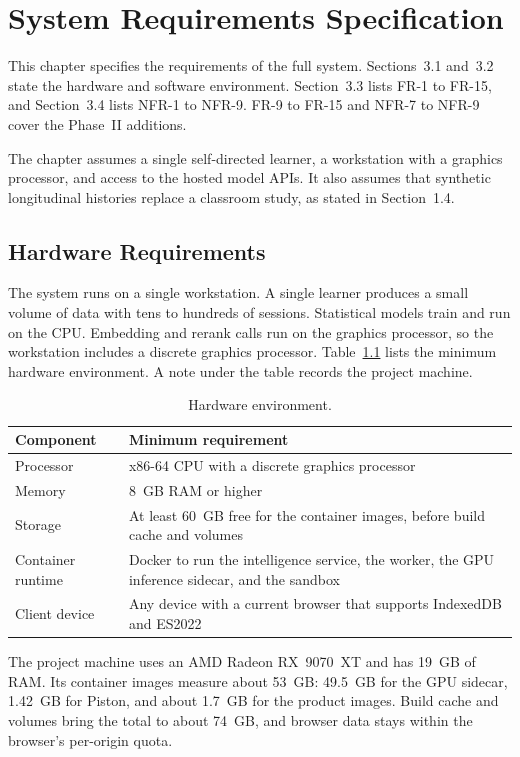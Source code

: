 \chapter{System Requirements Specification}
This chapter specifies the requirements of the full system. Sections~3.1 and~3.2 state the hardware and software environment. Section~3.3 lists FR-1 to FR-15, and Section~3.4 lists NFR-1 to NFR-9. FR-9 to FR-15 and NFR-7 to NFR-9 cover the Phase~II additions.

The chapter assumes a single self-directed learner, a workstation with a graphics processor, and access to the hosted model APIs. It also assumes that synthetic longitudinal histories replace a classroom study, as stated in Section~1.4.

\section{Hardware Requirements}
The system runs on a single workstation. A single learner produces a small volume of data with tens to hundreds of sessions. Statistical models train and run on the CPU. Embedding and rerank calls run on the graphics processor, so the workstation includes a discrete graphics processor. Table~\ref{tab:hardware} lists the minimum hardware environment. A note under the table records the project machine.

\begin{table}[htbp]
\centering
\caption{Hardware environment.}
\label{tab:hardware}
\begin{tabular}{p{4.2cm} p{8.0cm}}
\toprule
\textbf{Component} & \textbf{Minimum requirement} \\
\midrule
Processor & x86-64 CPU with a discrete graphics processor \\
Memory & 8~GB RAM or higher \\
Storage & At least 60~GB free for the container images, before build cache and volumes \\
Container runtime & Docker to run the intelligence service, the worker, the GPU inference sidecar, and the sandbox \\
Client device & Any device with a current browser that supports IndexedDB and ES2022 \\
\bottomrule
\end{tabular}
\end{table}

The project machine uses an AMD Radeon RX~9070~XT and has 19~GB of RAM. Its container images measure about 53~GB: 49.5~GB for the GPU sidecar, 1.42~GB for Piston, and about 1.7~GB for the product images. Build cache and volumes bring the total to about 74~GB, and browser data stays within the browser's per-origin quota.

